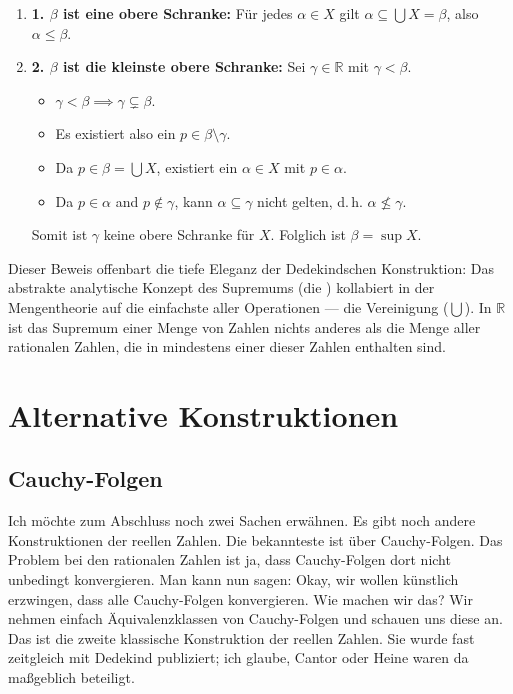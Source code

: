 \begin{math-stroke}
\begin{enumerate}[label=\textbf{\arabic*.}]
    \item \textbf{1. $\beta$ ist eine obere Schranke:} Für jedes $\alpha \in X$ gilt $\alpha \subseteq \bigcup X = \beta$, also $\alpha \le \beta$.
    \item \textbf{2. $\beta$ ist die kleinste obere Schranke:} Sei $\gamma \in \mathbb{R}$ mit $\gamma < \beta$.
    \begin{itemize}
        \item $\gamma < \beta \implies \gamma \subsetneq \beta$.
        \item Es existiert also ein $p \in \beta \setminus \gamma$.
        \item Da $p \in \beta = \bigcup X$, existiert ein $\alpha \in X$ mit $p \in \alpha$.
        \item Da $p \in \alpha$ and $p \notin \gamma$, kann $\alpha \subseteq \gamma$ nicht gelten, d.\,h. $\alpha \not\le \gamma$.
    \end{itemize}
    Somit ist $\gamma$ keine obere Schranke für $X$. Folglich ist $\beta = \sup X$.
\end{enumerate}
\end{math-stroke}

\begin{didactic-insight}
Dieser Beweis offenbart die tiefe Eleganz der Dedekindschen Konstruktion: Das abstrakte analytische Konzept des Supremums (die ) kollabiert in der Mengentheorie auf die einfachste aller Operationen --- die Vereinigung ($\bigcup$). In $\mathbb{R}$ ist das Supremum einer Menge von Zahlen nichts anderes als die Menge aller rationalen Zahlen, die in mindestens einer dieser Zahlen enthalten sind.
\end{didactic-insight}

\section{Alternative Konstruktionen}

\subsection{Cauchy-Folgen}

\begin{spoken-clean}[01:21:00 - 01:21:10]
Ich möchte zum Abschluss noch zwei Sachen erwähnen. Es gibt noch andere Konstruktionen der reellen Zahlen. Die bekannteste ist über Cauchy-Folgen. Das Problem bei den rationalen Zahlen ist ja, dass Cauchy-Folgen dort nicht unbedingt konvergieren. Man kann nun sagen: Okay, wir wollen künstlich erzwingen, dass alle Cauchy-Folgen konvergieren. Wie machen wir das? Wir nehmen einfach Äquivalenzklassen von Cauchy-Folgen und schauen uns diese an. Das ist die zweite klassische Konstruktion der reellen Zahlen. Sie wurde fast zeitgleich mit Dedekind publiziert; ich glaube, Cantor oder Heine waren da maßgeblich beteiligt.
\end{spoken-clean}

